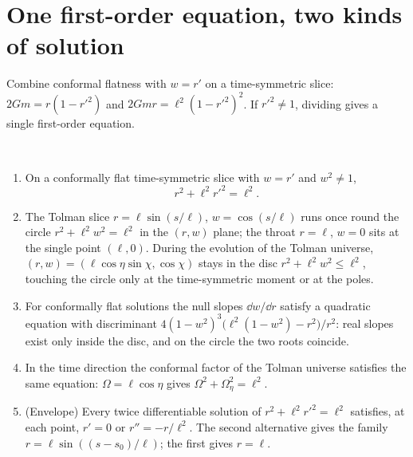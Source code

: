 \section{One first-order equation, two kinds of solution}

Combine conformal flatness with $w=r'$ on a time-symmetric slice: $2Gm=r(1-r'^2)$ and $2Gmr=\ell^2(1-r'^2)^2$. If $r'^2\ne1$, dividing gives a single first-order equation.

\begin{theorem}\label{thm:shape}\ver\
\begin{enumerate}[label=(\roman*)]
\item On a conformally flat time-symmetric slice with $w=r'$ and $w^2\ne1$,
\[
r^2+\ell^2r'^2=\ell^2 .
\]
\item The Tolman slice $r=\ell\sin(s/\ell)$, $w=\cos(s/\ell)$ runs once round the circle $r^2+\ell^2w^2=\ell^2$ in the $(r,w)$ plane; the throat $r=\ell$, $w=0$ sits at the single point $(\ell,0)$. During the evolution of the Tolman universe, $(r,w)=(\ell\cos\eta\sin\chi,\cos\chi)$ stays in the disc $r^2+\ell^2w^2\le\ell^2$, touching the circle only at the time-symmetric moment or at the poles.
\item For conformally flat solutions the null slopes $\dd w/\dd r$ satisfy a quadratic equation with discriminant $4(1-w^2)^3\bigl(\ell^2(1-w^2)-r^2\bigr)/r^2$: real slopes exist only inside the disc, and on the circle the two roots coincide.
\item In the time direction the conformal factor of the Tolman universe satisfies the same equation: $\Omega=\ell\cos\eta$ gives $\Omega^2+\Omega_\eta^2=\ell^2$.
\item (Envelope) Every twice differentiable solution of $r^2+\ell^2r'^2=\ell^2$ satisfies, at each point, $r'=0$ or $r''=-r/\ell^2$. The second alternative gives the family $r=\ell\sin((s-s_0)/\ell)$; the first gives $r=\ell$.
\end{enumerate}
\end{theorem}
